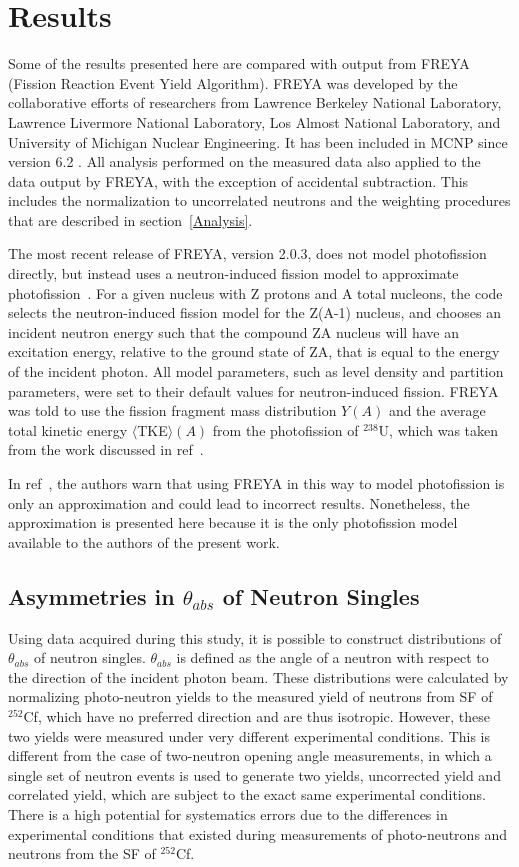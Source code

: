 \chapter{Results}
Some of the results presented here are compared with output from FREYA (Fission Reaction Event Yield Algorithm). 
FREYA was developed by the collaborative efforts of researchers from Lawrence Berkeley National Laboratory,  Lawrence Livermore National Laboratory, Los Almost National Laboratory, and University of Michigan Nuclear Engineering.
It has been included in MCNP since version 6.2 .
All analysis performed on the measured data also applied to the data output by FREYA, with the exception of accidental subtraction.
This includes the normalization to uncorrelated neutrons and the weighting procedures that are described in section~\ref{Analysis}.
 
The most recent release of FREYA, version 2.0.3, does not model photofission directly, but instead uses a neutron-induced fission model to approximate photofission~\cite{FREYA_photofission}.
For a given nucleus with Z protons and A total nucleons, the code selects the neutron-induced fission model for the Z(A-1) nucleus, and chooses an incident neutron energy such that the compound ZA nucleus will have an excitation energy, relative to the ground state of ZA, that is equal to the energy of the incident photon.
All model parameters, such as level density and partition parameters, were set to their default values for neutron-induced fission.
FREYA was told to use the fission fragment mass distribution $Y(A)$ and the average total kinetic energy $\langle$TKE$\rangle(A)$ from the photofission of $^{238}$U, which was taken from the work discussed in ref~\cite{2017Krishichayan}.

In ref~\cite{Talou2018}, the authors warn that using FREYA in this way to model photofission is only an approximation and could lead to incorrect results.
Nonetheless, the approximation is presented here because it is the only photofission model available to the authors of the present work.

\section{Asymmetries in $\theta_{abs}$ of Neutron Singles}
Using data acquired during this study, it is possible to construct distributions of $\theta_{abs}$ of neutron singles.
$\theta_{abs}$ is defined as the angle of a neutron with respect to the direction of the incident photon beam.
These distributions were calculated by normalizing photo-neutron yields to the measured yield of neutrons from SF of $^{252}$Cf, which have no preferred direction and are thus isotropic.
However, these two yields were measured under very different experimental conditions.
This is different from the case of two-neutron opening angle measurements, in which a single set of neutron events is used to generate two yields, uncorrected yield and correlated yield, which are subject to the exact same experimental conditions.
 There is a high potential for systematics errors due to the differences in experimental conditions that existed during measurements of photo-neutrons and neutrons from the SF of $^{252}$Cf.
 
